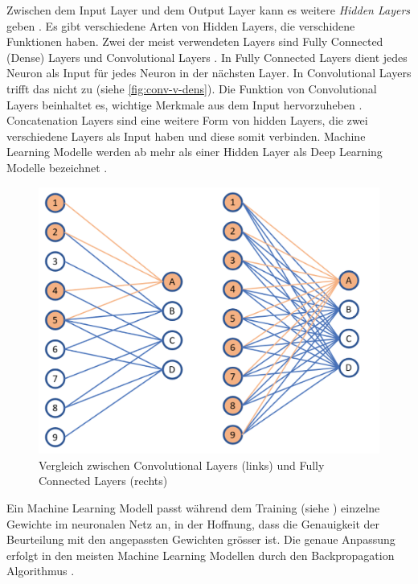 Zwischen dem Input Layer und dem Output Layer kann es weitere \emph{Hidden
Layers} geben \cite{malik_what_2019}. Es gibt verschiedene Arten von Hidden
Layers, die verschidene Funktionen haben. Zwei der meist verwendeten Layers sind
Fully Connected (Dense) Layers und Convolutional Layers
\cite{unzueta_convolutional_2022}. In Fully Connected Layers dient jedes Neuron
als Input für jedes Neuron in der nächsten Layer. In Convolutional Layers trifft
das nicht zu (siehe \autoref{fig:conv-v-dens}). Die Funktion von Convolutional
Layers beinhaltet es, wichtige Merkmale aus dem Input hervorzuheben
\cite{deshpande_beginners_nodate}. Concatenation Layers
\cite{jayawardana_concatenating_2021} sind eine weitere Form von hidden Layers,
die zwei verschiedene Layers als Input haben und diese somit verbinden. Machine
Learning Modelle werden ab mehr als einer Hidden Layer als Deep Learning Modelle
bezeichnet \cite{jan-dirk_kranz_deep_2019}.

\begin{figure}[!ht]
    \centering
    \includegraphics[width=\textwidth]{images/theorie/conv-v-dens.png}
    \caption{Vergleich zwischen Convolutional Layers (links) und Fully Connected Layers (rechts) \cite{unzueta_convolutional_2022}}
    \label{fig:conv-v-dens}
\end{figure}

Ein Machine Learning Modell passt während dem Training (siehe
) einzelne Gewichte im neuronalen Netz an, in der Hoffnung,
dass die Genauigkeit der Beurteilung mit den angepassten Gewichten grösser
ist. Die genaue Anpassung erfolgt in den meisten Machine Learning Modellen durch
den Backpropagation Algorithmus
\cite{ognjanovski_everything_2020}\cite{david_e_rumelhart_learning_nodate}.

